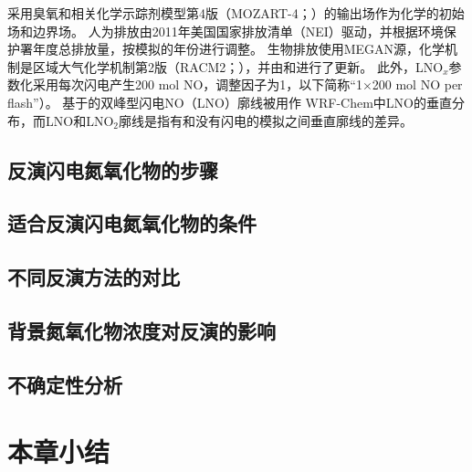 采用臭氧和相关化学示踪剂模型第4版（MOZART-4；\citet{Emmons.2010}）的输出场作为化学的初始场和边界场。
人为排放由2011年美国国家排放清单（NEI）驱动，并根据环境保护署年度总排放量，按模拟的年份进行调整\citep{EPA.2015}。
生物排放使用MEGAN源，化学机制是区域大气化学机制第2版（RACM2；\citet{Goliff.2013}），并由\citet{Browne.2014}和\citet{Schwantes.2015}进行了更新。
此外，LNO$_x$参数化采用每次闪电产生200 mol NO，调整因子为1，以下简称“1$\times$200 mol NO per flash”）。
基于\citet{Ott.2010}的双峰型闪电NO（LNO）廓线\citep{Laughner.2017}被用作 WRF-Chem中LNO的垂直分布，而LNO和LNO$_2$廓线是指有和没有闪电的模拟之间垂直廓线的差异。


\subsection{反演闪电氮氧化物的步骤}



\subsection{适合反演闪电氮氧化物的条件}

\subsection{不同反演方法的对比}

\subsection{背景氮氧化物浓度对反演的影响}

\subsection{不确定性分析}

\section{本章小结}
